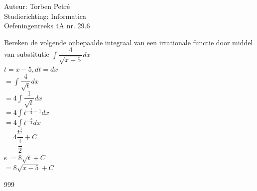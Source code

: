 \documentclass[a4paper]{article}
\begin{document}
  
\noindent \large Auteur: Torben Petré \\
\noindent \large Studierichting: Informatica\\
\noindent \large Oefeningenreeks 4A nr. 29.6\\

\medskip

\normalsize

Bereken de volgende onbepaalde integraal van een irrationale functie door middel van substitutie $\displaystyle\int \dfrac{4}{\sqrt{x - 5}}dx$\\

$t = x - 5, dt = dx$\\

$ =\displaystyle\int \dfrac{4}{\sqrt{t}} dx$\\

$ =4\displaystyle\int \dfrac{1}{\sqrt{t}} dx$\\

$ =4\displaystyle\int t^{-\tfrac{1}{2} - 1} dx$\\

$ =4\displaystyle\int t^{-\tfrac{3}{2}} dx$\\

$ =4\dfrac{t^{\tfrac{1}{2}}}{\dfrac{1}{2}} + C$\\
s
$ =8\sqrt{t} + C$\\

$ =8\sqrt{x - 5} + C$\\

\begin{thebibliography}{999}
\end{thebibliography}
\end{document}
